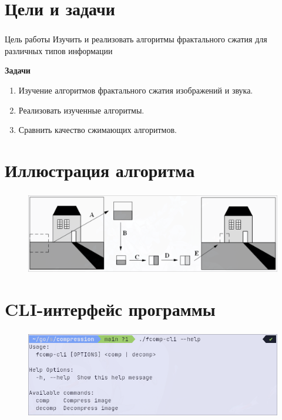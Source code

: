 \documentclass[t aspectratio=169]{beamer}
\begin{document}
  \section{Цели и задачи}
  \begin{frame}\frametitle{\insertsection}
    \large
    \begin{block}{Цель работы}
      Изучить и реализовать алгоритмы фрактального сжатия для различных типов информации
    \end{block}

    \vspace{1em}
    \textbf{Задачи}
    \begin{enumerate}
      \item Изучение алгоритмов фрактального сжатия изображений и звука.
      \item Реализовать изученные алгоритмы.
      \item Сравнить качество сжимающих алгоритмов.
    \end{enumerate}
    \normalfont
  \end{frame}

  \section{Иллюстрация алгоритма}
  \begin{frame}\frametitle{\insertsection}
    \begin{figure}
      \begin{center}
        \includegraphics[width=\textwidth]{./images/algorithm-illustration.png}
      \end{center}
    \end{figure}
  \end{frame}

  \section{CLI-интерфейс программы}
  \begin{frame}\frametitle{\insertsection}
   \begin{figure}
    \begin{center}
      \includegraphics[width=\textwidth]{./images/cli-main.png}
    \end{center}
   \end{figure}
  \end{frame}
\end{document}
